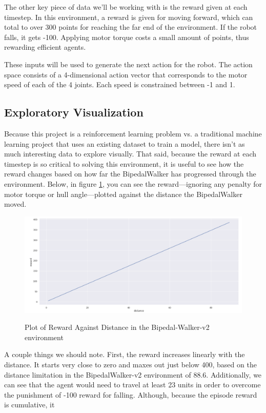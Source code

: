 \documentclass{article}
\begin{document}
The other key piece of data we'll be working with is the reward given at each timestep. In this environment, a reward is given for moving forward, which can total to over 300 points for reaching the far end of the environment. If the robot falls, it gets -100. Applying motor torque costs a small amount of points, thus rewarding efficient agents.

These inputs will be used to generate the next action for the robot. The action space consists of a 4-dimensional action vector that corresponds to the motor speed of each of the 4 joints. Each speed is constrained between -1 and 1. 


\subsection{Exploratory Visualization}
Because this project is a reinforcement learning problem vs. a traditional machine learning project that uses an existing dataset to train a model, there isn't as much interesting data to explore visually. That said, because the reward at each timestep is so critical to solving this environment, it is useful to see how the reward changes based on how far the BipedalWalker has progressed through the environment. Below, in figure \ref{fig:reward_v_distance}, you can see the reward—ignoring any penalty for motor torque or hull angle—plotted against the distance the BipedalWalker moved.

\begin{figure}[ht]
\caption{Plot of Reward Against Distance in the Bipedal-Walker-v2 environment}
\centering
\includegraphics[scale=0.4]{images/reward_v_distance.png}
\label{fig:reward_v_distance}
\end{figure}

A couple things we should note. First, the reward increases linearly with the distance. It starts very close to zero and maxes out just below 400, based on the distance limitation in the BipedalWalker-v2 environment of 88.6. Additionally, we can see that the agent would need to travel at least 23 units in order to overcome the punishment of -100 reward for falling. Although, because the episode reward is cumulative, it
\end{document}
